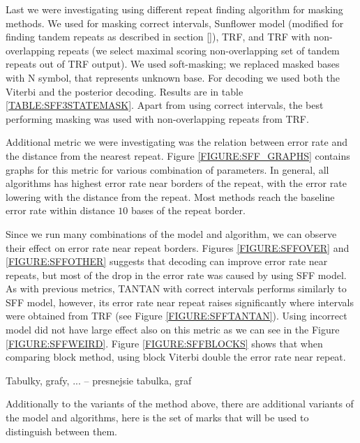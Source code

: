 Last we were investigating using different repeat finding
algorithm for masking methods. We used for masking correct intervals, Sunflower
model (modified for finding tandem repeats as described in section \ref{}),
TRF, and TRF with non-overlapping repeats (we select maximal scoring
non-overlapping set of tandem repeats out of TRF output). We used soft-masking;
we replaced masked bases with N symbol, that represents unknown base. For
decoding we used both the Viterbi and the posterior decoding. Results are in
table \ref{TABLE:SFF3STATEMASK}. Apart from  using correct intervals, the best
performing masking was used with non-overlapping repeats from TRF.

Additional metric we were investigating was the relation between error rate and
the distance from the nearest repeat. Figure \ref{FIGURE:SFF_GRAPHS} contains
graphs for this metric for various combination of parameters. In general, all
algorithms has highest error rate near borders of the repeat, with the error
rate lowering with the distance from the repeat. Most methods reach the
baseline error rate within distance $10$ bases of the repeat border.

Since we run many combinations of the model and algorithm, we can observe their
effect on error rate near repeat borders. Figures \ref{FIGURE:SFFOVER} and
\ref{FIGURE:SFFOTHER} suggests that decoding can improve error rate near
repeats, but most of the drop in the error rate was caused by using SFF model.
As with previous metrics, TANTAN with correct intervals performs similarly to
SFF model, however, its error rate near repeat raises significantly where
intervals were obtained from TRF (see Figure \ref{FIGURE:SFFTANTAN}). Using
incorrect model did not have large effect also on this metric as we can see in
the Figure \ref{FIGURE:SFFWEIRD}. Figure \ref{FIGURE:SFFBLOCKS} shows that when
comparing block method, using block Viterbi double the error rate near repeat.


\begin{reformulate*}
Tabulky, grafy, ... -- presnejsie tabulka, graf
\end{reformulate*}
\def\M{$^\circ$} %
\def\MM{$^{\circ\circ\circ}$} %
\def\D{$^{\circ\circ}$} %
\def\DD{$^{\dagger}$} %
\def\R{$^{\yen}$}
\def\RR{$^{\yen\yen}$}
\def\CC#1{\multicolumn{1}{c}{#1}} %
\def\S{$^{\star}$}
Additionally to the variants of the method above, there are additional variants
of the model and algorithms, here is the set of marks that will be used to
distinguish between them.

